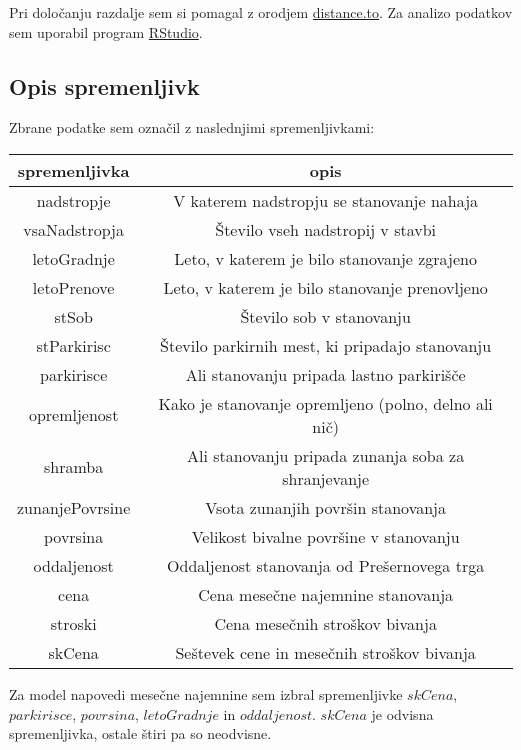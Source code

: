 \documentclass[a4paper, 12pt]{article}
\begin{document}
Pri določanju razdalje sem si pomagal z orodjem
\href{https://www.distance.to/}{distance.to}. Za analizo podatkov sem uporabil
program \href{https://rstudio.com/}{RStudio}.

\subsection{Opis spremenljivk}

Zbrane podatke sem označil z naslednjimi spremenljivkami:
\begin{center}
\begin{tabular}{ c|c}
	spremenljivka & opis \\
	\hline
	\hline
	nadstropje & V katerem nadstropju se stanovanje nahaja \\
	\hline
	vsaNadstropja & Število vseh nadstropij v stavbi \\
	\hline
	letoGradnje & Leto, v katerem je bilo stanovanje zgrajeno \\
	\hline
	letoPrenove & Leto, v katerem je bilo stanovanje prenovljeno \\
	\hline
	stSob & Število sob v stanovanju \\
	\hline
	stParkirisc & Število parkirnih mest, ki pripadajo stanovanju \\
	\hline
	parkirisce & Ali stanovanju pripada lastno parkirišče \\
	\hline
	opremljenost & Kako je stanovanje opremljeno (polno, delno ali nič) \\
	\hline
	shramba & Ali stanovanju pripada zunanja soba za shranjevanje \\
	\hline
	zunanjePovrsine & Vsota zunanjih površin stanovanja \\
	\hline
	povrsina & Velikost bivalne površine v stanovanju \\
	\hline
	oddaljenost & Oddaljenost stanovanja od Prešernovega trga \\
	\hline
	cena & Cena mesečne najemnine stanovanja \\
	\hline
	stroski & Cena mesečnih stroškov bivanja \\
	\hline
	skCena & Seštevek cene in mesečnih stroškov bivanja \\
\end{tabular}
\end{center}

Za model napovedi mesečne najemnine sem izbral spremenljivke $ skCena $,
$ parkirisce $, $ povrsina $, $ letoGradnje $ in
$ oddaljenost $. $ skCena $ je odvisna spremenljivka, ostale štiri pa
so neodvisne.
\end{document}
